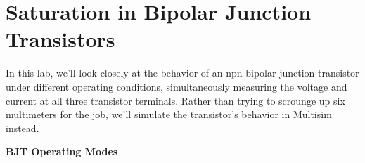\section{Saturation in  Bipolar Junction Transistors}
\label{lab_bjt_saturation}


\bigskip

In this lab, we'll look closely at the behavior of an npn bipolar junction transistor under different operating conditions, simultaneously measuring the voltage and current at all three transistor terminals.  Rather than trying to scrounge up six multimeters for the job, we'll simulate the transistor's behavior in Multisim instead.

\textbf{BJT Operating Modes}

